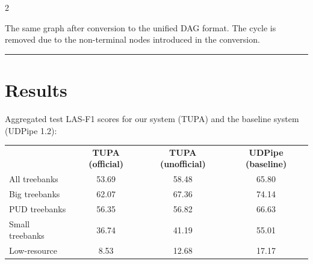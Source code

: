 \documentclass[a0,portrait]{a0poster}
\begin{document}
\begin{multicols}{2}
    
    
The same graph after conversion to the unified DAG format.
The cycle is removed due to the non-terminal nodes introduced in the conversion.


\hrule


\section*{Results}

Aggregated test LAS-F1 scores
for our system (TUPA) and the baseline system (UDPipe 1.2):
\begin{tabular}{lccc}
& \multirow{2}{32mm}{\bf TUPA {\small(official)}} & \multirow{2}{35mm}{\bf TUPA {\small(unofficial)}}
& \multirow{2}{34mm}{\bf UDPipe {\small(baseline)}} \\\\
All treebanks & 53.69 & 58.48 & 65.80 \\
Big treebanks & 62.07 & 67.36 & 74.14 \\
PUD treebanks & 56.35 & 56.82 & 66.63 \\
Small treebanks & 36.74 & 41.19 & 55.01 \\
Low-resource & 8.53 & 12.68 & 17.17
\end{tabular}


{
\setlength{\columnsep}{5mm}
\setlength{\columnseprule}{0pt}
}
\end{multicols}
\end{document}
